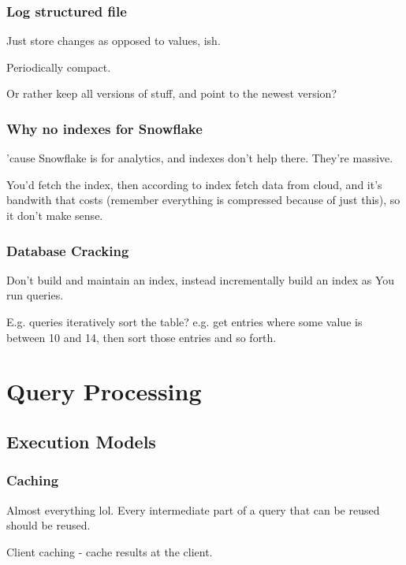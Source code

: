 \documentclass{article}
\begin{document}
			\subsubsection{Log structured file}
			
				Just store changes as opposed to values, ish.
				
				Periodically compact.
				
				Or rather keep all versions of stuff, and point to the newest version?
				
			\subsubsection{Why no indexes for Snowflake}
			
				'cause Snowflake is for analytics, and indexes don't help there. They're massive.
				
				You'd fetch the index, then according to index fetch data from cloud, and it's bandwith that costs (remember everything is compressed because of just this), so it don't make sense.
				
			\subsubsection{Database Cracking}
			
				Don't build and maintain an index, instead incrementally build an index as You run queries.
				
				E.g. queries iteratively sort the table? e.g. get entries where some value is between 10 and 14, then sort those entries and so forth.
				
\newpage
\section{Query Processing}

	\subsection{Execution Models}
	
		\subsubsection{Caching}
		
			Almost everything lol. Every intermediate part of a query that can be reused should be reused.
			
			Client caching - cache results at the client.
			
\end{document}
